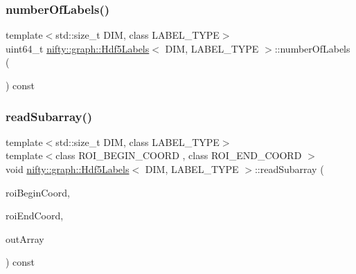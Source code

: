 \subsubsection{\texorpdfstring{number\+Of\+Labels()}{numberOfLabels()}}
{\footnotesize\ttfamily template$<$std\+::size\+\_\+t D\+IM, class L\+A\+B\+E\+L\+\_\+\+T\+Y\+PE$>$ \\
uint64\+\_\+t \hyperlink{classnifty_1_1graph_1_1Hdf5Labels}{nifty\+::graph\+::\+Hdf5\+Labels}$<$ D\+IM, L\+A\+B\+E\+L\+\_\+\+T\+Y\+PE $>$\+::number\+Of\+Labels (\begin{DoxyParamCaption}{ }\end{DoxyParamCaption}) const\hspace{0.3cm}{\ttfamily [inline]}}

\mbox{\label{classnifty_1_1graph_1_1Hdf5Labels_acee83d03d940eb4b5d0323b0eead3710}} 
\subsubsection{\texorpdfstring{read\+Subarray()}{readSubarray()}}
{\footnotesize\ttfamily template$<$std\+::size\+\_\+t D\+IM, class L\+A\+B\+E\+L\+\_\+\+T\+Y\+PE$>$ \\
template$<$class R\+O\+I\+\_\+\+B\+E\+G\+I\+N\+\_\+\+C\+O\+O\+RD , class R\+O\+I\+\_\+\+E\+N\+D\+\_\+\+C\+O\+O\+RD $>$ \\
void \hyperlink{classnifty_1_1graph_1_1Hdf5Labels}{nifty\+::graph\+::\+Hdf5\+Labels}$<$ D\+IM, L\+A\+B\+E\+L\+\_\+\+T\+Y\+PE $>$\+::read\+Subarray (\begin{DoxyParamCaption}\item[{const R\+O\+I\+\_\+\+B\+E\+G\+I\+N\+\_\+\+C\+O\+O\+RD \&}]{roi\+Begin\+Coord,  }\item[{const R\+O\+I\+\_\+\+E\+N\+D\+\_\+\+C\+O\+O\+RD \&}]{roi\+End\+Coord,  }\item[{\hyperlink{classandres_1_1View}{marray\+::\+View}$<$ L\+A\+B\+E\+L\+\_\+\+T\+Y\+PE $>$ \&}]{out\+Array }\end{DoxyParamCaption}) const\hspace{0.3cm}{\ttfamily [inline]}}

\mbox{\label{classnifty_1_1graph_1_1Hdf5Labels_a5bc58e72f8e6dc4f015a6562f4bc58ed}} 
